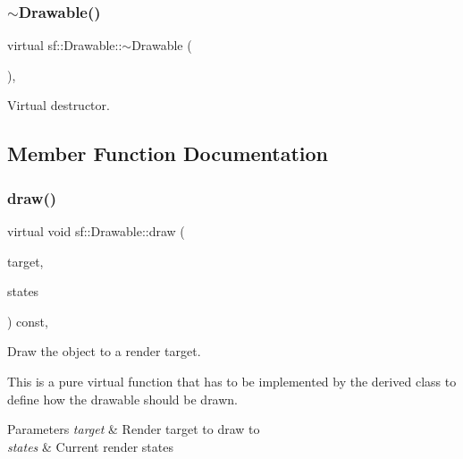 \subsubsection{\texorpdfstring{$\sim$Drawable()}{~Drawable()}}
{\footnotesize\ttfamily virtual sf\+::\+Drawable\+::$\sim$\+Drawable (\begin{DoxyParamCaption}{ }\end{DoxyParamCaption})\hspace{0.3cm}{\ttfamily [inline]}, {\ttfamily [virtual]}}



Virtual destructor. 

\begin{DoxyVerb}\end{DoxyVerb}
 

\subsection{Member Function Documentation}
\mbox{\label{classsf_1_1_drawable_a90d2c88bba9b035a0844eccb380ef631}} 
\subsubsection{\texorpdfstring{draw()}{draw()}}
{\footnotesize\ttfamily virtual void sf\+::\+Drawable\+::draw (\begin{DoxyParamCaption}\item[{\mbox{\hyperlink{classsf_1_1_render_target}{Render\+Target}} \&}]{target,  }\item[{\mbox{\hyperlink{classsf_1_1_render_states}{Render\+States}}}]{states }\end{DoxyParamCaption}) const\hspace{0.3cm}{\ttfamily [protected]}, {}}



Draw the object to a render target. 

This is a pure virtual function that has to be implemented by the derived class to define how the drawable should be drawn.


\begin{DoxyParams}{Parameters}
{\em target} & Render target to draw to \\
\hline
{\em states} & Current render states \begin{DoxyVerb}\end{DoxyVerb}
 \\
\hline
\end{DoxyParams}


